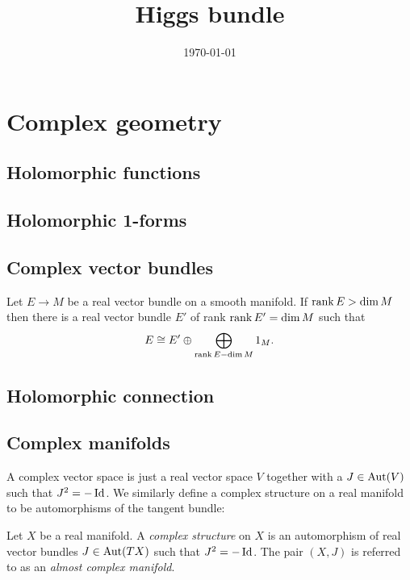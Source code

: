 \documentclass{article}
\begin{document}
\title{Higgs bundle}
\date{\today}
\maketitle

\section{Complex geometry}

\subsection{Holomorphic functions}

\subsection{Holomorphic 1-forms}

\subsection{Complex vector bundles}


\begin{theorem}\label{thm:dim_rank_vector_bundles}
  Let $E\to M$ be a real vector bundle on a smooth manifold. If $\operatorname{rank} E > \dim M$ then there is a real vector bundle $E'$ of rank $\operatorname{rank} E' = \dim M$
  such that
  \begin{align*}
    E \cong E' \oplus \bigoplus_{\operatorname{rank} E - \dim M} 1_M.
  \end{align*}
\end{theorem}

\subsection{Holomorphic connection}

\subsection{Complex manifolds}

A complex vector space is just a real vector space $V$ together with a
$J\in\operatorname{Aut}(V)$ such that $J^2 = -\operatorname{Id}$. We similarly define
a complex structure on a real manifold to be automorphisms of the
tangent bundle:

\begin{definition}
  Let $X$ be a real manifold. A \emph{complex structure} on $X$
  is an automorphism of real vector bundles $J\in\operatorname{Aut}(TX)$ such
  that $J^2 = -\operatorname{Id}$. The pair $(X,J)$ is referred to as an
  \emph{almost complex manifold}.
\end{definition}
\end{document}
